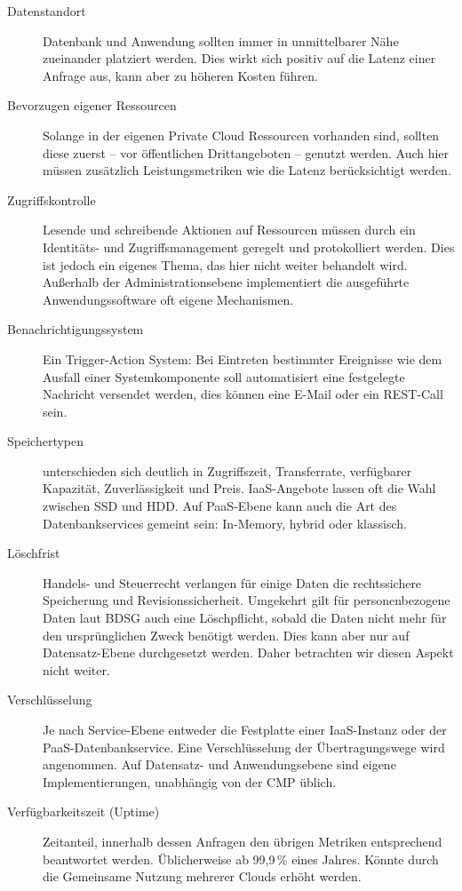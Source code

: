 \begin{description}
	\item[Datenstandort] Datenbank und Anwendung sollten immer in unmittelbarer Nähe zueinander platziert werden. Dies wirkt sich positiv auf die Latenz einer Anfrage aus, kann aber zu höheren Kosten führen.
	
	\item[Bevorzugen eigener Ressourcen] Solange in der eigenen Private Cloud Ressourcen vorhanden sind, sollten diese zuerst -- vor öffentlichen Drittangeboten -- genutzt werden. Auch hier müssen zusätzlich Leistungsmetriken wie die Latenz berücksichtigt werden.
	
	\item[Zugriffskontrolle] Lesende und schreibende Aktionen auf Ressourcen müssen durch ein Identitäts- und Zugriffsmanagement geregelt und protokolliert werden. Dies ist jedoch ein eigenes Thema, das hier nicht weiter behandelt wird. Außerhalb der Administrationsebene implementiert die ausgeführte Anwendungssoftware oft eigene Mechanismen.
		
	\item[Benachrichtigungssystem] Ein Trigger-Action System: Bei Eintreten bestimmter Ereignisse wie dem Ausfall einer Systemkomponente soll automatisiert eine festgelegte Nachricht versendet werden, dies können eine E-Mail oder ein REST-Call sein.
	
	\item[Speichertypen] unterschieden sich deutlich in Zugriffszeit, Transferrate, verfügbarer Kapazität, Zuverlässigkeit und Preis. IaaS-Angebote lassen oft die Wahl zwischen SSD und HDD. Auf PaaS-Ebene kann auch die Art des Datenbankservices gemeint sein: In-Memory, hybrid oder klassisch.
	
	\item[Löschfrist] Handels- und Steuerrecht verlangen für einige Daten die rechtssichere Speicherung und Revisionssicherheit. Umgekehrt gilt für personenbezogene Daten laut BDSG auch eine Löschpflicht, sobald die Daten nicht mehr für den ursprünglichen Zweck benötigt werden. Dies kann aber nur auf Datensatz-Ebene durchgesetzt werden. Daher betrachten wir diesen Aspekt nicht weiter.
	
	\item[Verschlüsselung] Je nach Service-Ebene entweder die Festplatte einer IaaS-Instanz oder der PaaS-Datenbankservice. Eine Verschlüsselung der Übertragungswege wird angenommen. Auf Datensatz- und Anwendungsebene sind eigene Implementierungen, unabhängig von der CMP üblich.
		
	\item[Verfügbarkeitszeit (Uptime)] Zeitanteil, innerhalb dessen Anfragen den übrigen Metriken entsprechend beantwortet werden. Üblicherweise ab 99,9\,\% eines Jahres. Könnte durch die Gemeinsame Nutzung mehrerer Clouds erhöht werden.	
	

\end{description}
